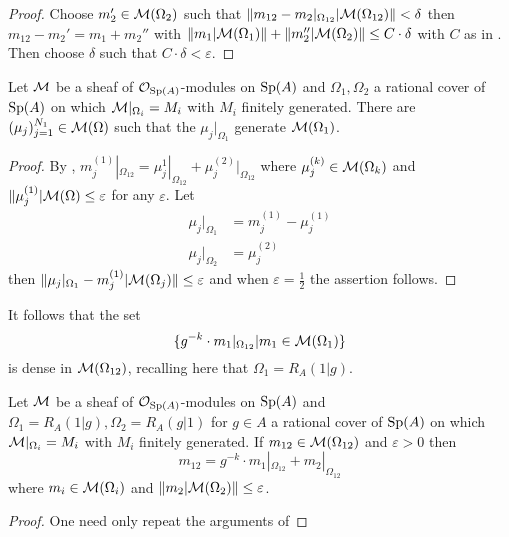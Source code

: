 \begin{proof}
    Choose $m_{2}'\in\mathcal{M}(\Omega_{2})$ such that $\Vert m_{12}-m_{2}|_{\Omega_{12}}|\mathcal{M}(\Omega_{12})\Vert<\delta$ then $m_{12}-m_{2}'=m_{1}+m_{2}''$ with $\Vert m_{1}|\mathcal{M}(\Omega_{1})\Vert+\Vert m_{2}''|\mathcal{M}(\Omega_{2})\Vert\leq C\cdot\delta$ with $C$ as in . Then choose $\delta$ such that $C\cdot\delta<\varepsilon$. 
\end{proof}
\begin{corollary}\label{corr: generating tuple}
    Let $\mathcal{M}$ be a sheaf of $\mathcal{O}_{\mathrm{Sp}(A)}$-modules on $\mathrm{Sp}(A)$ and $\Omega_{1},\Omega_{2}$ a rational cover of $\mathrm{Sp}(A)$ on which $\mathcal{M}|_{\Omega_{i}}=M_{i}$ with $M_{i}$ finitely generated. There are $(\mu_{j})_{j=1}^{N_{1}}\in\mathcal{M}(\Omega)$ such that the $\mu_{j}|_{\Omega_{1}}$ generate $\mathcal{M}(\Omega_{1})$. 
\end{corollary}
\begin{proof}
    By , $m_{j}^{(1)}|_{\Omega_{12}}=\mu_{j}^{1}|_{\Omega_{12}}+\mu_{j}^{(2)}|_{\Omega_{12}}$ where $\mu_{j}^{(k)}\in\mathcal{M}(\Omega_{k})$ and $\Vert \mu_{j}^{(1)}|\mathcal{M}(\Omega)\leq\varepsilon$ for any $\varepsilon$. Let 
    \begin{align*}
        \mu_{j}|_{\Omega_{1}} &= m_{j}^{(1)} - \mu_{j}^{(1)} \\
        \mu_{j}|_{\Omega_{2}} &= \mu_{j}^{(2)}
    \end{align*}
    then $\Vert \mu_{j}|_{\Omega_{1}}-m_{j}^{(1)}|\mathcal{M}(\Omega_{j})\Vert\leq\varepsilon$ and when $\varepsilon=\frac{1}{2}$ the assertion follows. 
\end{proof}
It follows that the set 
$$\{g^{-k}\cdot m_{1}|_{\Omega_{12}}|m_{1}\in\mathcal{M}(\Omega_{1})\}$$
is dense in $\mathcal{M}(\Omega_{12})$, recalling here that $\Omega_{1}=R_{A}(1|g)$. 
\begin{corollary}\label{corr: fractional sum decomposition}
    Let $\mathcal{M}$ be a sheaf of $\mathcal{O}_{\mathrm{Sp}(A)}$-modules on $\mathrm{Sp}(A)$ and $\Omega_{1}=R_{A}(1|g),\Omega_{2}=R_{A}(g|1)$ for $g\in A$ a rational cover of $\mathrm{Sp}(A)$ on which $\mathcal{M}|_{\Omega_{i}}=M_{i}$ with $M_{i}$ finitely generated. If $m_{12}\in\mathcal{M}(\Omega_{12})$ and $\varepsilon>0$ then 
    $$m_{12}=g^{-k}\cdot m_{1}|_{\Omega_{12}}+m_{2}|_{\Omega_{12}}$$
    where $m_{i}\in\mathcal{M}(\Omega_{i})$ and $\Vert m_{2}|\mathcal{M}(\Omega_{2})\Vert\leq\varepsilon$. 
\end{corollary}
\begin{proof}
    One need only repeat the arguments of 
\end{proof}
